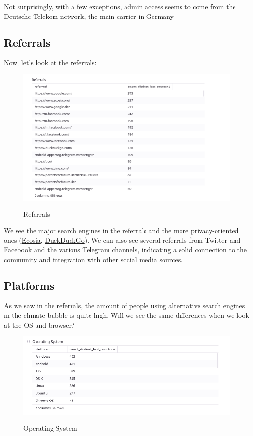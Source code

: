 Not surprisingly, with a few exceptions, admin access seems to come from the Deutsche Telekom network, the main carrier in Germany

\subsection{Referrals}

Now, let's look at the referrals:

\begin{figure}[H]
\centering
\caption {Referrals}
\includegraphics[width=\linewidth]{images/figure07.png}
\label{fig:referrals}
\end{figure}

We see the major search engines in the referrals and the more privacy-oriented ones (\href{https://www.ecosia.org/?c=en}{Ecosia}, \href{https://duckduckgo.com/}{DuckDuckGo}). We can also see several referrals from Twitter and Facebook and the various Telegram channels, indicating a solid connection to the community and integration with other social media sources.

\subsection{Platforms}

As we saw in the referrals, the amount of people using alternative search engines in the climate bubble is quite high. Will we see the same differences when we look at the OS and browser?

\begin{figure}[H]
\centering
\caption {Operating System}
\includegraphics[width=\linewidth]{images/figure08.png}
\label{fig:operatingSystem}
\end{figure}

